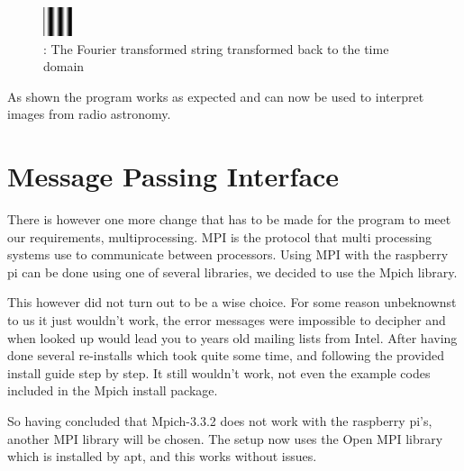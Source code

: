 \documentclass[11pt, A4, oneside]{article}
\begin{document}
\begin{figure}[!ht]
	\centering
	\includegraphics[scale=10]{processed_string_time_domain}
	\caption{: The Fourier transformed string transformed back to the time domain}
	\label{processed_string_time_domain}
\end{figure}

As shown the program works as expected and can now be used to interpret images from radio astronomy.

\section{Message Passing Interface}

There is however one more change that has to be made for the program to meet our requirements, multiprocessing. MPI is the protocol that multi processing systems use to communicate between processors. Using MPI with the raspberry pi can be done using one of several libraries, we decided to use the Mpich library. \par This however did not turn out to be a wise choice. For some reason unbeknownst to us it just wouldn't work, the error messages were impossible to decipher and when looked up would lead you to years old mailing lists from Intel. After having done several re-installs which took quite some time, and following the provided install guide step by step. It still wouldn't work, not even the example codes included in the Mpich install package. \par So having concluded that Mpich-3.3.2 does not work with the raspberry pi's, another MPI library will be chosen. The setup now uses the Open MPI library which is installed by apt, and this works without issues. 




\end{document}
